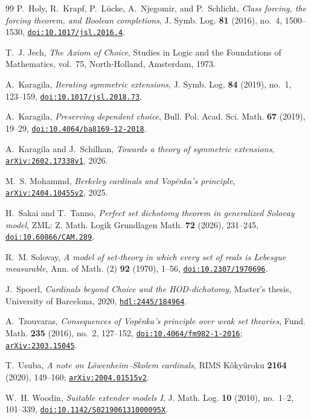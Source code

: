 \documentclass[11pt,a4paper]{amsart}
\theoremstyle{plain}
\theoremstyle{definition}
\theoremstyle{remark}
\begin{document}
\begin{thebibliography}{99}
P.~Holy, R.~Krapf, P.~L\"ucke, A.~Njegomir, and P.~Schlicht,
\emph{Class forcing, the forcing theorem, and Boolean completions},
J. Symb. Log. \textbf{81} (2016), no.~4, 1500--1530,
\href{https://doi.org/10.1017/jsl.2016.4}{\nolinkurl{doi:10.1017/jsl.2016.4}}.

T.~J. Jech,
\emph{The Axiom of Choice},
Studies in Logic and the Foundations of Mathematics, vol.~75,
North-Holland, Amsterdam, 1973.

A.~Karagila,
\emph{Iterating symmetric extensions},
J. Symb. Log. \textbf{84} (2019), no.~1, 123--159,
\href{https://doi.org/10.1017/jsl.2018.73}{\nolinkurl{doi:10.1017/jsl.2018.73}}.

A.~Karagila,
\emph{Preserving dependent choice},
Bull. Pol. Acad. Sci. Math. \textbf{67} (2019), 19--29,
\href{https://doi.org/10.4064/ba8169-12-2018}{\nolinkurl{doi:10.4064/ba8169-12-2018}}.

A.~Karagila and J.~Schilhan,
\emph{Towards a theory of symmetric extensions},
\href{https://arxiv.org/abs/2602.17338}{\nolinkurl{arXiv:2602.17338v1}}, 2026.

M.~S. Mohammd,
\emph{Berkeley cardinals and Vop\v{e}nka's principle},
\href{https://arxiv.org/abs/2404.10455v2}{\nolinkurl{arXiv:2404.10455v2}}, 2025.

H.~Sakai and T.~Tanno,
\emph{Perfect set dichotomy theorem in generalized Solovay model},
ZML: Z. Math. Logik Grundlagen Math. \textbf{72} (2026), 231--245,
\href{https://doi.org/10.60866/CAM.289}{\nolinkurl{doi:10.60866/CAM.289}}.

R.~M. Solovay,
\emph{A model of set-theory in which every set of reals is Lebesgue measurable},
Ann. of Math. (2) \textbf{92} (1970), 1--56,
\href{https://doi.org/10.2307/1970696}{\nolinkurl{doi:10.2307/1970696}}.

J.~Spoerl,
\emph{Cardinals beyond Choice and the HOD-dichotomy},
Master's thesis, University of Barcelona, 2020,
\href{https://hdl.handle.net/2445/184964}{\nolinkurl{hdl:2445/184964}}.

A.~Tzouvaras,
\emph{Consequences of Vop\v{e}nka's principle over weak set theories},
Fund. Math. \textbf{235} (2016), no.~2, 127--152,
\href{https://doi.org/10.4064/fm982-1-2016}{\nolinkurl{doi:10.4064/fm982-1-2016}};
\href{https://arxiv.org/abs/2303.15045}{\nolinkurl{arXiv:2303.15045}}.

T.~Usuba,
\emph{A note on L\"owenheim--Skolem cardinals},
RIMS K\^oky\^uroku \textbf{2164} (2020), 149--160;
\href{https://arxiv.org/abs/2004.01515}{\nolinkurl{arXiv:2004.01515v2}}.

W.~H. Woodin,
\emph{Suitable extender models I},
J. Math. Log. \textbf{10} (2010), no.~1--2, 101--339,
\href{https://doi.org/10.1142/S021906131000095X}{\nolinkurl{doi:10.1142/S021906131000095X}}.

\end{thebibliography}
\end{document}
